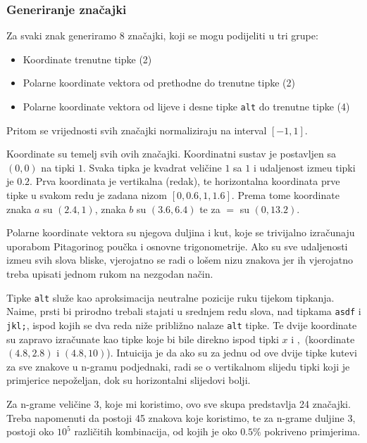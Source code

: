 \documentclass[a4paper,twocolumn,dvipdfm]{article}
\begin{document}
\subsubsection{Generiranje zna\v{c}ajki}

Za svaki znak generiramo 8 zna\v{c}ajki, koji se mogu podijeliti u tri grupe:
\begin{itemize}
        \item Koordinate trenutne tipke (2)
        \item Polarne koordinate vektora od prethodne do trenutne tipke (2)
        \item Polarne koordinate vektora od lijeve i desne tipke \texttt{alt}
            do trenutne tipke (4)
\end{itemize}
Pritom se vrijednosti svih zna\v{c}ajki normaliziraju na interval $[-1, 1]$.

Koordinate su temelj svih ovih zna\v{c}ajki. Koordinatni sustav je postavljen
sa $(0,0)$ na tipki $1$. Svaka tipka je kvadrat veli\v{c}ine $1$ sa $1$ i
udaljenost izme\dj u tipki je $0.2$. Prva koordinata je vertikalna (redak), te
horizontalna koordinata prve tipke u svakom redu je zadana nizom $[0, 0.6, 1,
1.6]$. Prema tome koordinate znaka $a$ su $(2.4, 1)$, znaka $b$ su $(3.6, 6.4)$
te za $=$ su $(0, 13.2)$. 

Polarne koordinate vektora su njegova duljina i kut, koje se trivijalno
izra\v{c}unaju uporabom Pitagorinog pou\v{c}ka i osnovne trigonometrije. Ako su
sve udaljenosti izme\dj u svih slova bliske, vjerojatno se radi o lo\v{s}em
nizu znakova jer ih vjerojatno treba upisati jednom rukom na nezgodan
na\v{c}in.

Tipke \texttt{alt} slu\v{z}e kao aproksimacija neutralne pozicije ruku tijekom
tipkanja. Naime, prsti bi prirodno trebali stajati u srednjem redu slova, nad
tipkama \texttt{asdf} i \texttt{jkl;}, ispod kojih se dva reda ni\v{z}e
pribli\v{z}no nalaze \texttt{alt} tipke. Te dvije koordinate su zapravo
izra\v{c}unate kao tipke koje bi bile direkno ispod tipki $x$ i $,$ (koordinate
$(4.8, 2.8)$ i $(4.8, 10)$). Intuicija je da ako su za jednu od ove dvije tipke
kutevi za sve znakove u n-gramu podjednaki, radi se o vertikalnom slijedu tipki
koji je primjerice nepo\v{z}eljan, dok su horizontalni slijedovi bolji.

Za n-grame veli\v{c}ine 3, koje mi koristimo, ovo sve skupa predstavlja 24
zna\v{c}ajki. Treba napomenuti da postoji 45 znakova koje koristimo, te za
n-grame duljine 3, postoji oko $10^5$ razli\v{c}itih kombinacija, od kojih je
oko $0.5\%$ pokriveno primjerima.
\end{document}

